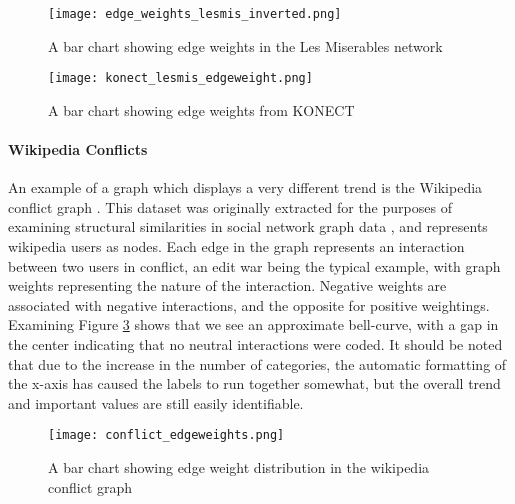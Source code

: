 \begin{figure}
	\centering
	\texttt{[image: edge\_weights\_lesmis\_inverted.png]}
	\caption{A bar chart showing edge weights in the Les Miserables network}
	\label{fig:edgeweightslesmis}
\end{figure}
\begin{figure}
	\centering
	\texttt{[image: konect\_lesmis\_edgeweight.png]}
	\caption{A bar chart showing edge weights from KONECT}
	\label{fig:edgeweightskonect}
\end{figure}

\paragraph{Wikipedia Conflicts}
An example of a graph which displays a very different trend is the Wikipedia conflict graph \citep{konect:2014:wikiconflict}. This dataset was originally extracted for the purposes of examining structural similarities in social network graph data \citep{konect:brandes09}, and represents wikipedia users as nodes. Each edge in the graph represents an interaction between two users in conflict, an edit war being the typical example, with graph weights representing the nature of the interaction. Negative weights are associated with negative interactions, and the opposite for positive weightings. Examining Figure \ref{fig:wiki_conf} shows that we see an approximate bell-curve, with a gap in the center indicating that no neutral interactions were coded. It should be noted that due to the increase in the number of categories, the automatic formatting of the x-axis has caused the labels to run together somewhat, but the overall trend and important values are still easily identifiable. 

\begin{figure}
	\centering
	\texttt{[image: conflict\_edgeweights.png]}
	\caption{A bar chart showing edge weight distribution in the wikipedia conflict graph}
	\label{fig:wiki_conf}
\end{figure}

